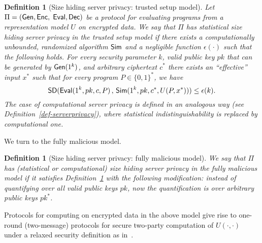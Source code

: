 \documentclass[11pt]{article}
\newtheorem{definition}[theorem]{Definition}
\newcommand{\eps}{{\epsilon}}
\newcommand{\SD}{{\sf SD }}
\newcommand{\gen}{{\sf Gen}}
\newcommand{\enc}{{\sf Enc}}
\newcommand{\eval}{{\sf Eval}}
\renewcommand{\sim}{{\sf Sim}}
\newcommand{\dec}{{\sf Dec}}
\newcommand{\mathify}[1]{\ifmmode{#1}\else\mbox{$#1$}\fi}
\newcommand{\set}[2][]{\mathify{{\left\{#2\right\}}^{#1}}}
\newcommand{\bools}[1][]{\set[#1]{0,1}}
\newcommand{\fnrngdom}[2]{#1\to#2}
\newcommand{\fndef}[3]{{#1\,:\,\fnrngdom{#2}{#3}}}
\begin{document}
\begin{definition}[Size hiding server privacy: trusted setup model]
\label{def-trustedsetup} Let $\Pi=(\gen,\enc,$ $\eval,\dec)$ be a
protocol for evaluating programs from a representation model
$U$ on encrypted data. We say that $\Pi$ has {\em statistical size
hiding server privacy in the trusted setup model} if there exists a
computationally unbounded, randomized algorithm $\sim$ and a
negligible function $\eps(\cdot)$ such that the following holds.
For every security parameter $k$, valid public key $pk$ that can be
generated by $\gen(1^k)$, and arbitrary ciphertext $c^*$ there
exists an ``effective'' input $x^*$ such that for every program
$P\in\{0,1\}^*$, we have
\[ \SD(\eval(1^k,pk,c,P)\,,\,\sim(1^k,
pk, c^*, U(P,x^*))) \le \epsilon(k). \]
 The case of {\em  computational} server privacy is defined in an
 analogous way (see Definition~\ref{def-serverprivacy}),
 where statistical indistinguishability is
 replaced by computational one.
\end{definition}
We turn to the fully malicious model.
\begin{definition}[Size hiding server privacy: fully malicious model]
\label{def-fullymalicious} We say that $\Pi$ has (statistical or
computational) {\em size hiding server privacy in the fully
malicious model} if it satisfies Definition~\ref{def-trustedsetup}
with the following modification: instead of quantifying over all
{\em valid} public keys $pk$, now the quantification is over
arbitrary public keys $pk^*$.
\end{definition}

Protocols for computing on encrypted data in the above model give
rise to one-round (two-message) protocols for secure two-party
computation of $U(\cdot,\cdot)$ under a relaxed security definition
as in~\cite{NP01,AIR01,FIPR05}.

\end{document}
